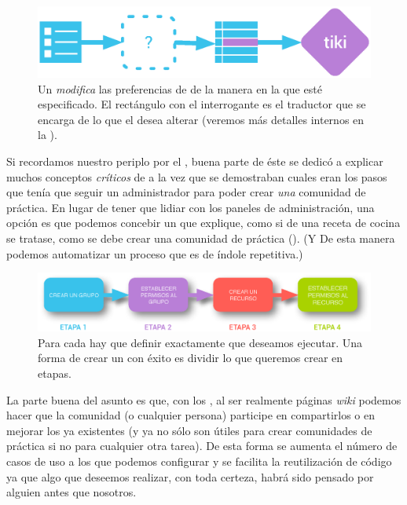 \begin{figure}[h!]
\centering
\includegraphics[width=\linewidth]{../graphics/fig_flujo_accion_profile.eps}
\caption{Un \profile{} \textit{modifica} las preferencias de \tiki{} de la manera en la que esté especificado. El rectángulo con el interrogante es el traductor que se encarga de  lo que el \profile{} desea alterar (veremos más detalles internos en la ).}\label{fig:flujo_accion_profile}
\end{figure}

Si recordamos nuestro periplo por el , buena parte de éste se dedicó a explicar muchos conceptos \textit{críticos} de \tiki{} a la vez que se demostraban cuales eran los pasos que tenía que seguir un administrador para poder crear \textit{una} comunidad de práctica.
En lugar de tener que lidiar con los paneles de administración, una opción es que podemos concebir un \profile{} que explique, como si de una receta de cocina se tratase, como se debe crear una comunidad de práctica (). (Y De esta manera podemos automatizar un proceso que es de índole repetitiva.)

\begin{figure}[h!]
\centering
\includegraphics[width=\linewidth]{../graphics/fig_etapas_profile.eps}
\caption{Para cada \profile{} hay que definir exactamente que deseamos ejecutar. Una forma de crear un \profile{} con éxito es dividir lo que queremos crear en etapas.}\label{fig:etapas_profile}
\end{figure}

La parte buena del asunto es que, con los \profiles{}, al ser realmente páginas \textit{wiki} podemos hacer que la comunidad (o cualquier persona) participe en compartirlos o en mejorar los ya existentes (y ya no sólo son útiles para crear comunidades de práctica si no para cualquier otra tarea). De esta forma se aumenta el número de casos de uso a los que podemos configurar \tiki{} y se facilita la reutilización de código ya que algo que deseemos realizar, con toda certeza, habrá sido pensado por alguien antes que nosotros.

